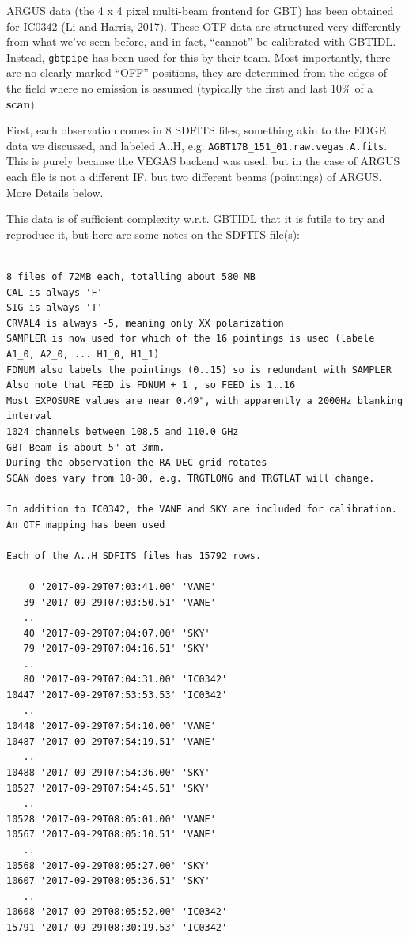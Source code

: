 \documentclass[12pt,a4paper]{article}
\begin{document}
ARGUS data (the 4 x 4 pixel multi-beam frontend for GBT) has been
obtained for IC0342 (Li and Harris, 2017). These OTF data are structured very
differently from what we've seen before, and in fact, ``cannot'' be
calibrated with GBTIDL.  Instead, {\tt gbtpipe} has been used for this by their team.
Most importantly, there are no clearly marked ``OFF'' positions, they are determined from the
edges of the field where no emission is assumed (typically the first and last 10\% of a {\bf scan}).

First, each observation comes in 8 SDFITS
files, something akin to the EDGE data we discussed, and labeled A..H,
e.g. {\tt AGBT17B\_151\_01.raw.vegas.A.fits}. This is purely because the VEGAS backend
was used, but in the case of ARGUS each file is not a different IF, but two different
beams (pointings) of ARGUS.  More Details below.

\bigskip
This data is of sufficient complexity w.r.t. GBTIDL that it is futile to try and reproduce it,
but here are some notes on the SDFITS file(s):

\footnotesize
\begin{verbatim}

8 files of 72MB each, totalling about 580 MB
CAL is always 'F'
SIG is always 'T'
CRVAL4 is always -5, meaning only XX polarization
SAMPLER is now used for which of the 16 pointings is used (labele A1_0, A2_0, ... H1_0, H1_1)
FDNUM also labels the pointings (0..15) so is redundant with SAMPLER
Also note that FEED is FDNUM + 1 , so FEED is 1..16
Most EXPOSURE values are near 0.49", with apparently a 2000Hz blanking interval
1024 channels between 108.5 and 110.0 GHz
GBT Beam is about 5" at 3mm.
During the observation the RA-DEC grid rotates
SCAN does vary from 18-80, e.g. TRGTLONG and TRGTLAT will change.

In addition to IC0342, the VANE and SKY are included for calibration.
An OTF mapping has been used

Each of the A..H SDFITS files has 15792 rows.

    0 '2017-09-29T07:03:41.00' 'VANE'
   39 '2017-09-29T07:03:50.51' 'VANE'
   ..
   40 '2017-09-29T07:04:07.00' 'SKY'
   79 '2017-09-29T07:04:16.51' 'SKY'
   ..
   80 '2017-09-29T07:04:31.00' 'IC0342'
10447 '2017-09-29T07:53:53.53' 'IC0342'
   ..
10448 '2017-09-29T07:54:10.00' 'VANE'
10487 '2017-09-29T07:54:19.51' 'VANE'
   ..
10488 '2017-09-29T07:54:36.00' 'SKY'
10527 '2017-09-29T07:54:45.51' 'SKY'
   ..
10528 '2017-09-29T08:05:01.00' 'VANE'
10567 '2017-09-29T08:05:10.51' 'VANE'
   ..
10568 '2017-09-29T08:05:27.00' 'SKY'
10607 '2017-09-29T08:05:36.51' 'SKY'
   ..
10608 '2017-09-29T08:05:52.00' 'IC0342'
15791 '2017-09-29T08:30:19.53' 'IC0342'

\end{verbatim}
\normalsize
\end{document}
